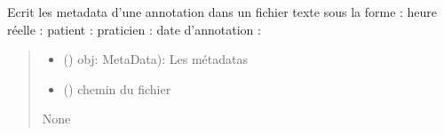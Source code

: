 \documentclass[letterpaper,10pt,english]{sphinxmanual}
\begin{document}

\begin{fulllineitems}
\label{\detokenize{frise:frise.ecriture_fichier.EcrireMetaData}}
\pysigstartsignatures
{}
\pysigstopsignatures
\sphinxAtStartPar
Ecrit les metadata d’une annotation dans un fichier texte sous la forme : heure réelle :    patient :       praticien :     date d’annotation :
\begin{quote}\begin{description}
\begin{itemize}
\item {} 
\sphinxAtStartPar
\sphinxstyleliteralstrong{\sphinxupquote{(}} () \textendash{} obj: MetaData): Les métadatas

\item {} 
\sphinxAtStartPar
{} () \textendash{} chemin du fichier

\end{itemize}

\sphinxAtStartPar
None

\end{description}\end{quote}

\end{fulllineitems}

\end{document}
